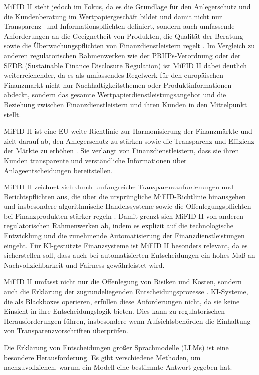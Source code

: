     MiFID II steht jedoch im Fokus, da es die Grundlage für den Anlegerschutz und die Kundenberatung im Wertpapiergeschäft bildet und damit nicht nur Transparenz- und Informationspflichten definiert, sondern auch umfassende Anforderungen an die Geeignetheit von Produkten, die Qualität der Beratung sowie die Überwachungspflichten von Finanzdienstleistern regelt \autocite{ESMA2023MiFIDII}.
    Im Vergleich zu anderen regulatorischen Rahmenwerken wie der PRIIPs-Verordnung oder der SFDR (Sustainable Finance Disclosure Regulation) ist MiFID II dabei deutlich weiterreichender, da es als umfassendes Regelwerk für den europäischen Finanzmarkt nicht nur Nachhaltigkeitsthemen oder Produktinformationen abdeckt, sondern das gesamte Wertpapierdienstleistungsangebot und die Beziehung zwischen Finanzdienstleistern und ihren Kunden in den Mittelpunkt stellt.

    MiFID II ist eine EU-weite Richtlinie zur Harmonisierung der Finanzmärkte und zielt darauf ab, den Anlegerschutz zu stärken sowie die Transparenz und Effizienz der Märkte zu erhöhen \autocite{ESMA2023MiFIDII}.
    Sie verlangt von Finanzdienstleistern, dass sie ihren Kunden transparente und verständliche Informationen über Anlageentscheidungen bereitstellen.

    MiFID II zeichnet sich durch umfangreiche Transparenzanforderungen und Berichtspflichten aus, die über die ursprüngliche MiFID-Richtlinie hinausgehen und insbesondere algorithmische Handelssysteme sowie die Offenlegungspflichten bei Finanzprodukten stärker regeln \autocite{ESMA2023MiFIDII}.
    Damit grenzt sich MiFID II von anderen regulatorischen Rahmenwerken ab, indem es explizit auf die technologische Entwicklung und die zunehmende Automatisierung der Finanzdienstleistungen eingeht.
    Für KI-gestützte Finanzsysteme ist MiFID II besonders relevant, da es sicherstellen soll, dass auch bei automatisierten Entscheidungen ein hohes Maß an Nachvollziehbarkeit und Fairness gewährleistet wird.

    MiFID II umfasst nicht nur die Offenlegung von Risiken und Kosten, sondern auch die Erklärung der zugrundeliegenden Entscheidungsprozesse \autocite{ESMA2023MiFIDII}.
    KI-Systeme, die als Blackboxes operieren, erfüllen diese Anforderungen nicht, da sie keine Einsicht in ihre Entscheidungslogik bieten.
    Dies kann zu regulatorischen Herausforderungen führen, insbesondere wenn Aufsichtsbehörden die Einhaltung von Transparenzvorschriften überprüfen.

    Die Erklärung von Entscheidungen großer Sprachmodelle (\acs{LLM}s) ist eine besondere Herausforderung.
    Es gibt verschiedene Methoden, um nachzuvollziehen, warum ein Modell eine bestimmte Antwort gegeben hat.

